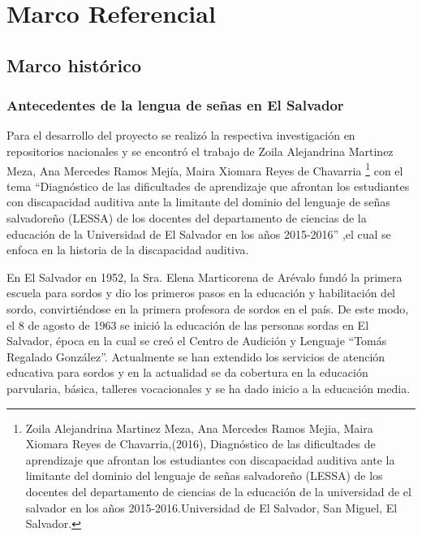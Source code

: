\documentclass[12pt]{report}%
\begin{document}
\newpage
\chapter{Marco Referencial}
\newpage
\section{Marco histórico}
\subsection{Antecedentes de la lengua de señas en El Salvador}
Para el desarrollo del proyecto se realizó la respectiva investigación en repositorios nacionales y se encontró el trabajo de Zoila Alejandrina Martinez Meza, Ana Mercedes Ramos Mejía, Maira Xiomara Reyes de Chavarria \footnote{Zoila Alejandrina Martinez Meza, Ana Mercedes Ramos Mejia, Maira Xiomara Reyes de Chavarria,(2016), Diagnóstico de las dificultades de aprendizaje que afrontan los estudiantes con discapacidad auditiva ante la limitante del dominio del lenguaje de señas salvadoreño (LESSA) de los docentes del departamento de ciencias de la educación de la universidad de el salvador en los años 2015-2016.Universidad de El Salvador, San Miguel, El Salvador. } %
con el tema “Diagnóstico de las dificultades de aprendizaje que afrontan los estudiantes con discapacidad auditiva ante la limitante del dominio del lenguaje de señas salvadoreño (LESSA) de los docentes del departamento de ciencias de la educación de la Universidad de El Salvador en los años 2015-2016” ,el cual se enfoca en la historia de la discapacidad auditiva.

En El Salvador en 1952, la Sra. Elena Marticorena de Arévalo fundó la primera escuela para sordos y dio los primeros pasos en la educación y habilitación del sordo, convirtiéndose en la primera profesora de sordos en el país. De este modo, el 8 de agosto de 1963 se inició la educación de las personas sordas en El Salvador, época en la cual se creó el Centro de Audición y Lenguaje “Tomás Regalado González”. Actualmente se han extendido los servicios de atención educativa para sordos y en la actualidad se da cobertura en la educación parvularia, básica, talleres vocacionales y se ha dado inicio a la educación media.
\end{document}
